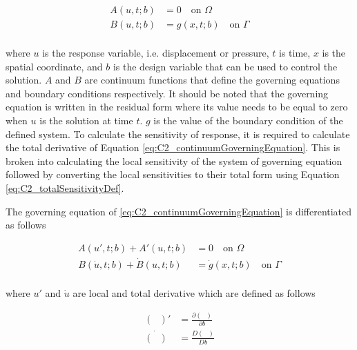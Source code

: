 \begin{subequations}\label{eq:C2_continuumGoverningEquation}
\begin{align}
	A(u, t; b) &= 0 \quad \text{on } \Omega \\
	B(u, t; b) &= g(x, t; b) \quad \text{on } \Gamma \\
\end{align}	
\end{subequations}

where $u$ is the response variable, i.e. displacement or pressure, $t$ is time, $x$ is the spatial coordinate, and $b$ is the design variable that can be used to control the solution. $A$ and $B$ are continuum functions that define the governing equations and boundary conditions respectively. It should be noted that the governing equation is written in the residual form where its value needs to be equal to zero when $u$ is the solution at time $t$. $g$ is the value of the boundary condition of the defined system. To calculate the sensitivity of response, it is required to calculate the total derivative of Equation \eqref{eq:C2_continuumGoverningEquation}. This is broken into calculating the local sensitivity of the system of governing equation followed by converting the local sensitivities to their total form using Equation \eqref{eq:C2_totalSensitivityDef}.

The governing equation of \eqref{eq:C2_continuumGoverningEquation} is differentiated as follows

\begin{subequations}\label{eq:C2_continuumSensitivityFormulation}
\begin{align}
	A(u', t; b) + A'(u, t; b) &= 0 \quad \text{on } \Omega \\
	B(\dot{u}, t; b) + \dot{B}(u, t; b) &= \dot{g}(x, t; b) \quad \text{on } \Gamma \\
\end{align}	
\end{subequations}

where $u'$ and $\dot{u}$ are local and total derivative which are defined as follows

\begin{subequations}
\begin{align*}
	(\text{ })' &= \frac{\partial (\text{ })}{\partial b} \\
	\dot{(\text{ })} &= \frac{D (\text{ })}{D b}
\end{align*}
\end{subequations}

